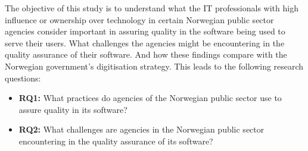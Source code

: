 


The objective of this study is to understand what the IT professionals with high influence or ownership over technology in certain Norwegian public sector agencies consider important in assuring quality in the software being used to serve their users. What challenges the agencies might be encountering in the quality assurance of their software. And how these findings compare with the Norwegian government's digitisation strategy. This leads to the following research questions:

\begin{itemize}
    \item \textbf{RQ1:} What practices do agencies of the Norwegian public sector use to assure quality in its software?
    \item \textbf{RQ2:} What challenges are agencies in the Norwegian public sector encountering in the quality assurance of its software?
\end{itemize}



